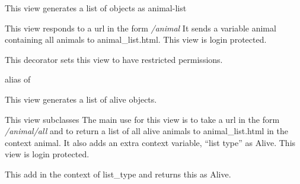 \documentclass[letterpaper,10pt,english]{sphinxmanual}
\begin{document}

\begin{fulllineitems}
\label{animals:mousedb.animal.views.AnimalList}
This view generates a list of {\hyperref[animals:mousedb.animal.models.Animal]{}} objects as animal-list

This view responds to a url in the form \emph{/animal}
It sends a variable animal containing all animals to animal\_list.html.
This view is login protected.

\begin{fulllineitems}
\label{animals:mousedb.animal.views.AnimalList.dispatch}
This decorator sets this view to have restricted permissions.

\end{fulllineitems}


\begin{fulllineitems}
\label{animals:mousedb.animal.views.AnimalList.model}
alias of 

\end{fulllineitems}


\end{fulllineitems}


\begin{fulllineitems}
\label{animals:mousedb.animal.views.AnimalListAlive}
This view generates a list of alive {\hyperref[animals:mousedb.animal.models.Animal]{}} objects.

This view subclasses {\hyperref[animals:mousedb.animal.views.AnimalList]{}} The main use for this view is to take a url in the form \emph{/animal/all} and to return a list of all alive animals to animal\_list.html in the context animal.  It also adds an extra context variable, ``list type'' as Alive.  
This view is login protected.

\begin{fulllineitems}
\label{animals:mousedb.animal.views.AnimalListAlive.get_context_data}
This add in the context of list\_type and returns this as Alive.

\end{fulllineitems}


\end{fulllineitems}
\end{document}
